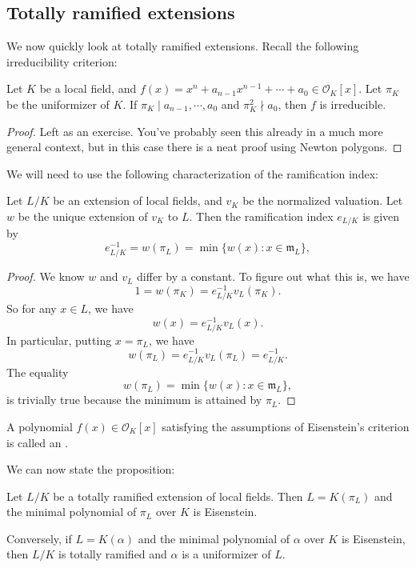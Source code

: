 \documentclass[a4paper]{article}
\begin{document}
\subsection{Totally ramified extensions}
We now quickly look at totally ramified extensions. Recall the following irreducibility criterion:
\begin{thm}
  Let $K$ be a local field, and $f(x) = x^n + a_{n - 1} x^{n - 1} + \cdots + a_0 \in \mathcal{O}_K[x]$. Let $\pi_K$ be the uniformizer of $K$. If $\pi_K \mid a_{n - 1}, \cdots, a_0$ and $\pi_K^2 \nmid a_0$, then $f$ is irreducible.
\end{thm}

\begin{proof}
  Left as an exercise. You've probably seen this already in a much more general context, but in this case there is a neat proof using Newton polygons.
\end{proof}

We will need to use the following characterization of the ramification index:
\begin{prop}
  Let $L/K$ be an extension of local fields, and $v_K$ be the normalized valuation. Let $w$ be the unique extension of $v_K$ to $L$. Then the ramification index $e_{L/K}$ is given by
  \[
    e_{L/K}^{-1} = w(\pi_L) = \min \{w(x): x \in \mathfrak{m}_L\},
  \]
\end{prop}

\begin{proof}
  We know $w$ and $v_L$ differ by a constant. To figure out what this is, we have
  \[
    1 = w(\pi_K) = e_{L/K}^{-1} v_L(\pi_K).
  \]
  So for any $x \in L$, we have
  \[
    w(x) = e_{L/K}^{-1} v_L(x).
  \]
  In particular, putting $x = \pi_L$, we have
  \[
    w(\pi_L) = e_{L/K}^{-1} v_L(\pi_L) = e_{L/K}^{-1}.
  \]
  The equality
  \[
    w(\pi_L) = \min \{w(x): x \in \mathfrak{m}_L\},
  \]
  is trivially true because the minimum is attained by $\pi_L$.
\end{proof}

\begin{defi}
  A polynomial $f(x) \in \mathcal{O}_K[x]$ satisfying the assumptions of Eisenstein's criterion is called an .
\end{defi}
We can now state the proposition:
\begin{prop}
  Let $L/K$ be a totally ramified extension of local fields. Then $L = K(\pi_L)$ and the minimal polynomial of $\pi_L$ over $K$ is Eisenstein.

  Conversely, if $L = K(\alpha)$ and the minimal polynomial of $\alpha$ over $K$ is Eisenstein, then $L/K$ is totally ramified and $\alpha$ is a uniformizer of $L$.
\end{prop}
\end{document}
